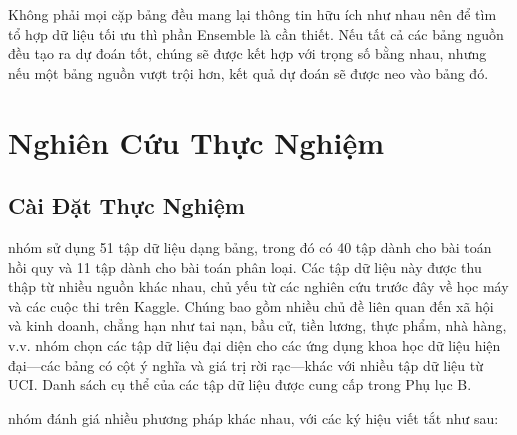 \documentclass{article}
\begin{document}
Không phải mọi cặp bảng đều mang lại thông tin hữu ích như nhau nên để tìm tổ hợp dữ liệu tối ưu thì phần Ensemble là cần thiết. Nếu tất cả các bảng nguồn đều tạo ra dự đoán tốt, chúng sẽ được kết hợp với trọng số bằng nhau, nhưng nếu một bảng nguồn vượt trội hơn, kết quả dự đoán sẽ được neo vào bảng đó.

\section{Nghiên Cứu Thực Nghiệm}
\subsection{Cài Đặt Thực Nghiệm}
nhóm sử dụng 51 tập dữ liệu dạng bảng, trong đó có 40 tập dành cho bài toán hồi quy và 11 tập dành cho bài toán phân loại. Các tập dữ liệu này được thu thập từ nhiều nguồn khác nhau, chủ yếu từ các nghiên cứu trước đây về học máy và các cuộc thi trên Kaggle. Chúng bao gồm nhiều chủ đề liên quan đến xã hội và kinh doanh, chẳng hạn như tai nạn, bầu cử, tiền lương, thực phẩm, nhà hàng, v.v. nhóm chọn các tập dữ liệu đại diện cho các ứng dụng khoa học dữ liệu hiện đại—các bảng có cột ý nghĩa và giá trị rời rạc—khác với nhiều tập dữ liệu từ UCI. Danh sách cụ thể của các tập dữ liệu được cung cấp trong Phụ lục B.

nhóm đánh giá nhiều phương pháp khác nhau, với các ký hiệu viết tắt như sau:
\end{document}
